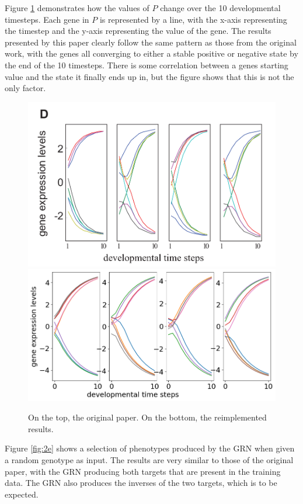 \documentclass[twocolumn,a4paper,12pt]{article}
\begin{document}
    Figure \ref{fig:2d} demonstrates how the values of $P$ change over the 10 developmental timesteps. Each gene in $P$ is represented by a line, with the x-axis representing the timestep and the y-axis representing the value of the gene. The results presented by this paper clearly follow the same pattern as those from the original work, with the genes all converging to either a stable positive or negative state by the end of the 10 timesteps. There is some correlation between a genes starting value and the state it finally ends up in, but the figure shows that this is not the only factor.

    \begin{figure}[h]
        \centering
        \includegraphics[width=0.9\linewidth]{orig_img/fig2d.png}
        \includegraphics[width=0.9\linewidth]{img/fig2d.png}
        \caption{On the top, the original paper. On the bottom, the reimplemented results.} \label{fig:2d}
    \end{figure}

    Figure \ref{fig:2e} shows a selection of phenotypes produced by the GRN when given a random genotype as input. The results are very similar to those of the original paper, with the GRN producing both targets that are present in the training data. The GRN also produces the inverses of the two targets, which is to be expected.
\end{document}
